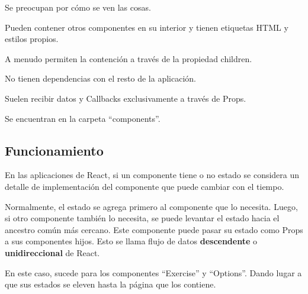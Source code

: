 \documentclass[12pt,twoside,titlepage]{report}
\begin{document}
\begin{compactitem}
    \item Se preocupan por cómo se ven las cosas.
    \item Pueden contener otros componentes en su interior y tienen etiquetas HTML y estilos propios.
    \item A menudo permiten la contención a través de la propiedad children.
    \item No tienen dependencias con el resto de la aplicación.
    \item Suelen recibir datos y Callbacks exclusivamente a través de Props.
    \item Se encuentran en la carpeta ``components''. %
\end{compactitem}

\subsection{Funcionamiento}

En las aplicaciones de React, si un componente tiene o no estado se considera un detalle de implementación del componente que puede cambiar con el tiempo.

Normalmente, el estado se agrega primero al componente que lo necesita. Luego, si otro componente también lo necesita, se puede levantar el estado hacia el ancestro común más cercano. Este componente puede pasar su estado como Props a sus componentes hijos. Esto se llama flujo de datos \textbf{descendente} o \textbf{unidireccional} de React. 

En este caso, sucede para los componentes ``Exercise'' y ``Options''. Dando lugar a que sus estados se eleven hasta la página que los contiene.
\end{document}
